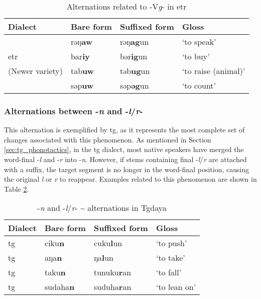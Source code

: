 \begin{table}[!htbp]
\centering
\caption{Alternations related to -V\textit{g}- in \acl{etr}}
\label{tab:Vg_alt_etr}
\begin{tabular}{llll}
\hline
Dialect                   & Bare form      & Suffixed form    & Gloss      \\ \hline
                          & rəŋ\textbf{aw}  & rəŋ\textbf{ag}un & `to speak'          \\
        \acl{etr}         & bar\textbf{iy} & bər\textbf{ig}un & `to buy'            \\
     (Newer variety)      & tab\textbf{uw} & təb\textbf{ug}un & `to raise (animal)' \\
                          & səp\textbf{uw} & səp\textbf{əg}un & `to count'          \\ \hline
\end{tabular}
\end{table}

\subsubsection{Alternations between -\textit{n} and -\textit{l}/\textit{r}- }

This alternation is exemplified by \acl{tg}, as it represents the most complete set of changes associated with this phenomenon. As mentioned in Section \ref{sec:tg_phonotactics}, in the \acl{tg} dialect, most native speakers have merged the word-final -\textit{l} and -\textit{r} into -\textit{n}. However, if stems containing final -\textit{l}/\textit{r} are attached with a suffix, the target segment is no longer in the word-final position, causing the original \textit{l} or \textit{r} to reappear. Examples related to this phenomenon are shown in Table \ref{tab:lrn_alt}.

\begin{table}[!htbp]
\centering
\caption{-\textit{n} and -\textit{l}/\textit{r}- \~{} alternations in Tgdaya}
\label{tab:lrn_alt}
\begin{tabular}{llll}
\hline
Dialect  & Bare form & Suffixed form & Gloss        \\ \hline
\acl{tg} & ciku\textbf{n}     & cuku\textbf{l}un      & `to push'    \\
\acl{tg} & aŋa\textbf{n}      & ŋa\textbf{l}un        & `to take'    \\
\acl{tg} & taku\textbf{n}     & tunuku\textbf{r}an    & `to fall'    \\
\acl{tg} & sudaha\textbf{n}   & suduha\textbf{r}an    & `to lean on' \\\hline
\end{tabular}
\end{table}

